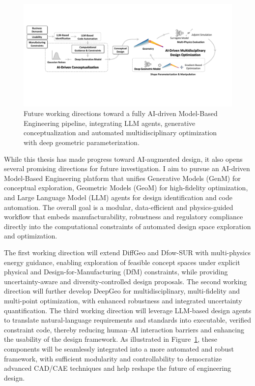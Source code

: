 \begin{figure}[!t]
    \centering
    \includegraphics[width=1\linewidth]{conclusion/fig/future_work.pdf}
    \caption{Future working directions toward a fully AI-driven Model-Based Engineering pipeline, integrating LLM agents, generative conceptualization and automated multidisciplinary optimization with deep geometric parameterization.}
    \label{conclusion:fig:future_work}
\end{figure}

While this thesis has made progress toward AI-augmented design, it also opens several promising directions for future investigation. I aim to pursue an AI-driven Model-Based Engineering platform that unifies Generative Models (GenM) for conceptual exploration, Geometric Models (GeoM) for high-fidelity optimization, and Large Language Model (LLM) agents for design identification and code automation. The overall goal is a modular, data-efficient and physics-guided workflow that embeds manufacturability, robustness and regulatory compliance directly into the computational constraints of automated design space exploration and optimization. 

The first working direction will extend DiffGeo and Dfow-SUR with multi-physics energy guidance, enabling exploration of feasible concept spaces under explicit physical and Design-for-Manufacturing (DfM) constraints, while providing uncertainty-aware and diversity-controlled design proposals. The second working direction will further develop DeepGeo for multidisciplinary, multi-fidelity and multi-point optimization, with enhanced robustness and integrated uncertainty quantification. The third working direction will leverage LLM-based design agents to translate natural-language requirements and standards into executable, verified constraint code, thereby reducing human–AI interaction barriers and enhancing the usability of the design framework. As illustrated in Figure~\ref{conclusion:fig:future_work}, these components will be seamlessly integrated into a more automated and robust framework, with sufficient modularity and controllability to democratize advanced CAD/CAE techniques and help reshape the future of engineering design.